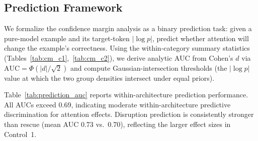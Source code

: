 \begin{table}[ht]
\centering
\caption{Cross-benchmark disruption analysis (Control 1): hurt vs.\ stayed-right on HellaSwag and ARC-Easy (1.3B h3-1).}
\label{tab:cm_cross_c1}
\end{table}

\subsection{Prediction Framework}\label{app:prediction_framework}

We formalize the confidence margin analysis as a binary prediction task: given a pure-model example and its target-token $|\log p|$, predict whether attention will change the example's correctness. Using the within-category summary statistics (Tables~\ref{tab:cm_c1},~\ref{tab:cm_c2}), we derive analytic AUC from Cohen's $d$ via $\text{AUC} = \Phi(|d|/\sqrt{2})$ and compute Gaussian-intersection thresholds (the $|\log p|$ value at which the two group densities intersect under equal priors).

Table~\ref{tab:prediction_auc} reports within-architecture prediction performance. All AUCs exceed 0.69, indicating moderate within-architecture predictive discrimination for attention effects. Disruption prediction is consistently stronger than rescue (mean AUC 0.73 vs.\ 0.70), reflecting the larger effect sizes in Control~1.

